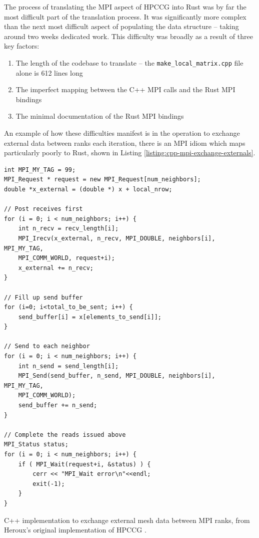 The process of translating the MPI aspect of \acrshort{HPCCG} into Rust was by far the most difficult part of the translation process. It was significantly more complex than the next most difficult aspect of populating the data structure -- taking around two weeks dedicated work. This difficulty was broadly as a result of three key factors:

\begin{enumerate}
    \item The length of the codebase to translate -- the \texttt{make\_local\_matrix.cpp} file alone is 612 lines long
    \item The imperfect mapping between the C++ MPI calls and the Rust MPI bindings
    \item The minimal documentation of the Rust MPI bindings
\end{enumerate}

An example of how these difficulties manifest is in
the operation to exchange external data between ranks each iteration, there is an MPI idiom which maps particularly poorly to Rust, shown in Listing \ref{listing:cpp-mpi-exchange-externals}.

\begin{code}
    \begin{verbatim}
int MPI_MY_TAG = 99;  
MPI_Request * request = new MPI_Request[num_neighbors];
double *x_external = (double *) x + local_nrow;

// Post receives first 
for (i = 0; i < num_neighbors; i++) {
    int n_recv = recv_length[i];
    MPI_Irecv(x_external, n_recv, MPI_DOUBLE, neighbors[i], MPI_MY_TAG, 
    MPI_COMM_WORLD, request+i);
    x_external += n_recv;
}

// Fill up send buffer
for (i=0; i<total_to_be_sent; i++) {
    send_buffer[i] = x[elements_to_send[i]];
}

// Send to each neighbor
for (i = 0; i < num_neighbors; i++) {
    int n_send = send_length[i];
    MPI_Send(send_buffer, n_send, MPI_DOUBLE, neighbors[i], MPI_MY_TAG, 
    MPI_COMM_WORLD);
    send_buffer += n_send;
}

// Complete the reads issued above
MPI_Status status;
for (i = 0; i < num_neighbors; i++) {
    if ( MPI_Wait(request+i, &status) ) {
        cerr << "MPI_Wait error\n"<<endl;
        exit(-1);
    }
}
    \end{verbatim}
    \caption{C++ implementation to exchange external mesh data between MPI ranks, from Heroux's original implementation of \acrshort{HPCCG} \cite{MantevoHPCCG2023}.}
    \label{listing:cpp-mpi-exchange-externals}
\end{code}

